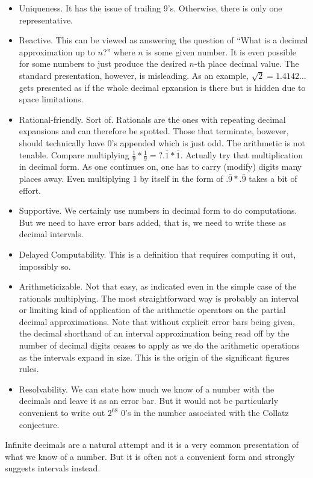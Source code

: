 \documentclass[12pt]{article}
\theoremstyle{remark}
\begin{document}
\begin{itemize}
    \item Uniqueness. It has the issue of trailing 9's. Otherwise, there is only one representative. 
    \item Reactive. This can be viewed as answering the question of ``What is a decimal approximation up to $n$?'' where $n$ is some given number. It is even possible for some numbers to just produce the desired $n$-th place decimal value. The standard presentation, however, is misleading. As an example, $\sqrt{2} = 1.4142...$ gets presented as if the whole decimal epxansion is there but is hidden due to space limitations. 
    \item Rational-friendly. Sort of. Rationals are the ones with repeating decimal expansions and can therefore be spotted. Those that terminate, however, should technically have 0's appended which is just odd. The arithmetic is not tenable. Compare multiplying $\tfrac{1}{9}*\tfrac{1}{9} =? .\bar{1} * \bar{1}$. Actually try that multiplication in decimal form. As one continues on, one has to carry (modify) digits many places away. Even multiplying 1 by itself in the form of $.\bar{9}*.\bar{9}$ takes a bit of effort. 
    \item Supportive. We certainly use numbers in decimal form to do computations. But we need to have error bars added, that is, we need to write these as decimal intervals. 
    \item Delayed Computability. This is a definition that requires computing it out, impossibly so. 
    \item Arithmeticizable. Not that easy, as indicated even in the simple case of the rationals multiplying. The most straightforward way is probably an interval or limiting kind of application of the arithmetic operators on the partial decimal approximations. Note that without explicit error bars being given, the decimal shorthand of an interval approximation being read off by the number of decimal digits ceases to apply as we do the arithmetic operations as the intervals expand in size. This is the origin of the significant figures rules. 
    \item Resolvability. We can state how much we know of a number with the decimals and leave it as an error bar. But it would not be particularly convenient to write out $2^{68}$ 0's in the number associated with the Collatz conjecture. 
\end{itemize}

Infinite decimals are a natural attempt and it is a very common presentation of what we know of a number. But it is often not a convenient form and strongly suggests intervals instead. 
\end{document}
